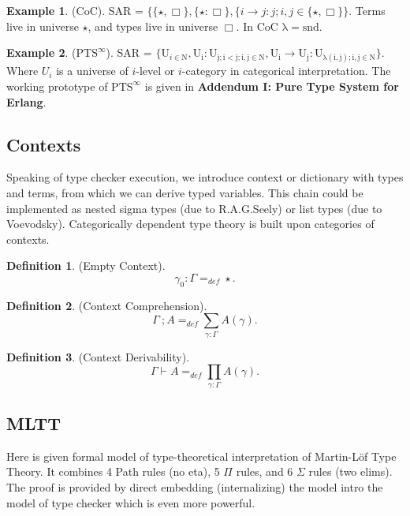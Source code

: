 \documentclass[twoside]{article}
\theoremstyle{definition}
\newtheorem{definition}{Definition}
\newtheorem{example}{Example}
\begin{document}
\begin{example} (CoC). SAR = $\{ \{\star , \Box \},\{ \star : \Box \},
        \{ i \rightarrow j : j; i, j \in \{ \star, \Box \}
        \}$. Terms live in universe $\star$, and types live in universe $\Box$. In CoC $\mathrm{\lambda=snd}$.
\end{example}

\begin{example} ($\mathrm{PTS}^\infty$). SAR = $\{ \mathrm{U}_{i \in \mathrm{N}},
    \mathrm{U_i : U_{j; i < j; i,j \in N}},
    \mathrm{U_i} \rightarrow \mathrm{U_j} : \mathrm{U_{\lambda(i,j); i,j \in \mathrm{N}}}
    \}$. Where $U_i$ is a universe of $i$-level or $i$-category in categorical interpretation.
    The working prototype of $\mathrm{PTS}^\infty$ is given in
    {\bf Addendum I: Pure Type System for Erlang}\cite{Tonpa18}.
\end{example}

\subsection{Contexts}

Speaking of type checker execution, we introduce context or dictionary with types and terms,
from which we can derive typed variables. This chain could be implemented as
nested sigma types (due to R.A.G.Seely) or list types (due to Voevodsky). Categorically
dependent type theory is built upon categories of contexts.

\begin{definition} (Empty Context).
$$
    \gamma_0 : \Gamma =_{def} \star.
$$
\end{definition}

\begin{definition} (Context Comprehension).
$$
\Gamma\ ; A =_{def} \sum_{\gamma:\Gamma}A(\gamma).
$$
\end{definition}

\begin{definition} (Context Derivability).
$$
\Gamma \vdash A =_{def} \prod_{\gamma:\Gamma}A(\gamma).
$$
\end{definition}

\subsection{MLTT}

Here is given formal model of type-theoretical interpretation of Martin-Löf Type Theory.
It combines 4 Path rules (no eta), 5 $\Pi$ rules, and 6 $\Sigma$ rules (two elims).
The proof is provided by direct embedding (internalizing) the model intro the model
of type checker which is even more powerful.
\end{document}
